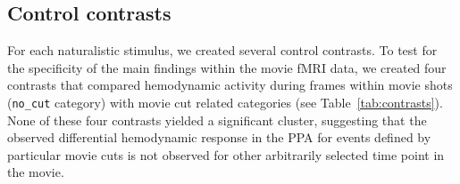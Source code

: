 \documentclass[english,11pt]{article}
\begin{document}
\subsection*{Control contrasts}



For each naturalistic stimulus, we created several control contrasts.
To test for the specificity of the main findings within the movie fMRI data, we
created four contrasts that compared hemodynamic activity during frames within
movie shots (\texttt{no\_cut} category) with movie cut related categories (see
Table~\ref{tab:contrasts}).
None of these four contrasts yielded a significant cluster, suggesting that the
observed differential hemodynamic response in the PPA for events defined by
particular movie cuts is not observed for other arbitrarily selected time point
in the movie.
\end{document}
